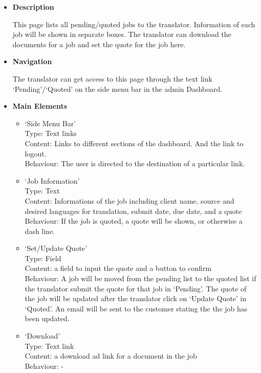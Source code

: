 \documentclass{l3proj}
\begin{document}
\begin{itemize}
\item \textbf{Description}

This page lists all pending/quoted jobs to the translator. Information of each job will be shown in separate boxes. 
The translator can download the documents for a job and set the quote for the job here.

\item \textbf{Navigation}

The translator can get access to this page through the text link
`Pending'/`Quoted' on the side menu bar in the admin Dashboard.

\item \textbf{Main Elements}
\begin{itemize}
\item `Side Menu Bar'\\
Type: Text links\\
Content: Links to different sections of the dashboard. And the link to logout. \\
Behaviour: The user is directed to the destination of a particular link. \\

\item `Job Information'\\
Type: Text\\
Content: Informations of the job including client name, source and desired languages for translation, submit date, due date, and a quote \\
Behaviour: If the job is quoted, a quote will be shown, or otherwise a dash line. \\

\item `Set/Update Quote'\\
Type: Field\\
Content: a field to input the quote and a button to confirm \\
Behaviour: A job will be moved from the pending list to the quoted list if the translator submit the quote for that job in `Pending'. The quote of the job will be updated after the translator click on `Update Quote' in `Quoted'. An email will be sent to the customer stating the the job has been updated.\\

\item `Download'\\
Type: Text link\\
Content: a download
ad link for a document in the job\\
Behaviour: -\\
\end{itemize}
\end{itemize}
\end{document}
